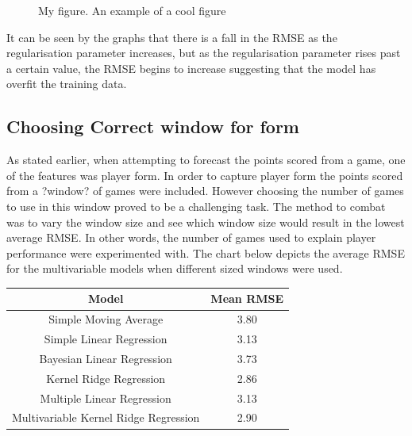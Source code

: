\documentclass[a4paper,11pt,twoside]{article}
\begin{document}
      \begin{figure}[!htb]
        \caption{\label{fig:my-label} My figure.  An example of a cool figure}
      \end{figure}


It can be seen by the graphs that there is a fall in the RMSE as the regularisation parameter increases, but as the regularisation parameter rises past a certain value, the RMSE begins to increase suggesting that the model has overfit the training data.



\subsection{Choosing Correct window for form}

As stated earlier, when attempting to forecast the points scored from a game, one of the features was player form. In order to capture player form the points scored from a ?window? of games were included. However choosing the number of games to use in this window proved to be a challenging task. The method to combat was to vary the window size and see which window size would result in the lowest average RMSE. In other words, the number of games used to explain player performance were experimented with. The chart below depicts the average RMSE for the multivariable models when different sized windows were used. 

\vspace{5mm}
\begin{center}
\begin{tabular}{ |c|c|} 
 \hline
     \textbf{Model} & \textbf{Mean RMSE}\\ 
 \hline
 Simple Moving Average  & 3.80\\ 
 \hline
 Simple Linear Regression & 3.13\\ 
 \hline
 Bayesian Linear Regression  & 3.73 \\
 \hline
 Kernel Ridge Regression  & 2.86\\
 \hline
 Multiple Linear Regression& 3.13\\
 \hline
 Multivariable Kernel Ridge Regression  & 2.90\\
 \hline
\end{tabular}
\end{center}
\vspace{5mm}
\end{document}
